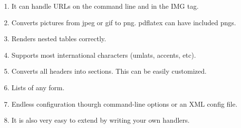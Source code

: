 \documentclass[10pt,a4paper]{article}
\begin{document}
\begin{enumerate}
   \item It can handle URLs on the command line and in the IMG tag.
   \item Converts pictures from jpeg or gif to png.  pdflatex can have included pngs.
   \item Renders nested tables correctly.
   \item Supports most international characters (umlats, accents, etc).
   \item Converts all headers into sections.  This can be easily customized.
   \item Lists of any form.
   \item Endless configuration thourgh command-line options or an XML config file.
   \item It is also very easy to extend by writing your own handlers.
\end{enumerate}
\end{document}
